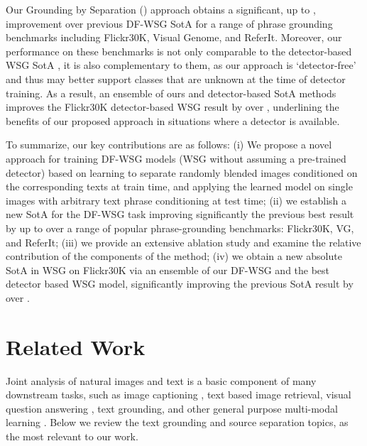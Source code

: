 \documentclass[10pt,twocolumn,letterpaper]{article}
\def\oursfull{Grounding by Separation }
\def\ourstask{DF-WSG}
\def\ourstaskspace{DF-WSG }
\newcommand\secvspace{\vspace{-0.0cm}}
\begin{document}
Our \oursfull{} (\ours) approach obtains a significant, up to , improvement over previous \ourstask{} SotA \cite{akbari2019multi} for a range of phrase grounding benchmarks including Flickr30K, Visual Genome, and ReferIt. 
Moreover, our performance on these benchmarks is not only comparable to the detector-based WSG SotA \cite{datta2019align2ground,gupta2020contrastive,lu202012}, it is also complementary to them, as our approach is `detector-free' and thus may better support classes that are unknown at the time of detector training. As a result, an ensemble of ours and detector-based SotA methods \cite{gupta2020contrastive,lu202012} improves the Flickr30K detector-based WSG result by over , underlining the benefits of our proposed \ours{} approach in situations where a detector is available.


To summarize, our key contributions are as follows: (i) We propose a novel \ours{} approach for training \ourstask{} models (WSG without assuming a pre-trained detector) based on learning to separate randomly blended images conditioned on the corresponding texts at train time, and applying the learned model on single images with arbitrary text phrase conditioning at test time; (ii) we establish a new SotA for the \ourstask{} task improving significantly the previous best result by up to  over a range of popular phrase-grounding benchmarks: Flickr30K, VG, and ReferIt; (iii) we provide an extensive ablation study and examine the relative contribution of the components of the \ours{} method; (iv) we obtain a new absolute SotA in WSG on Flickr30K via an ensemble of our \ourstaskspace and the best detector based WSG model, significantly improving the previous SotA result by over .
%
 \secvspace
\section{Related Work}
\secvspace
Joint analysis of natural images and text is a basic component of many downstream tasks, such as image captioning \cite{cornia2020meshed, karpathy2015deep, pan2020x, vinyals2016show, wang2016image, yao2017boosting, you2016image, zhou2020unified}, text based image retrieval\cite{chen2020uniter,lee2018stacked, lu2019vilbert,lu202012,wang2016learning,young2014image}, visual question answering \cite{alberti2019fusion, antol2015vqa, chen2020counterfactual, gokhale2020vqa, goyal2017making,xu2016ask}, text grounding\cite{akbari2019multi,chen2017msrc,chen2017query,datta2019align2ground,gupta2020contrastive,plummer2015flickr30k,wang2019phrase}, and other general purpose multi-modal learning \cite{huang2020pixel, li2020unicoder,li2019visualbert, li2020weakly,  radford2021learning,  su2019vl, sun2019videobert, tan2019lxmert}. Below we review the text grounding and source separation topics, as the most relevant to our work.
\end{document}
